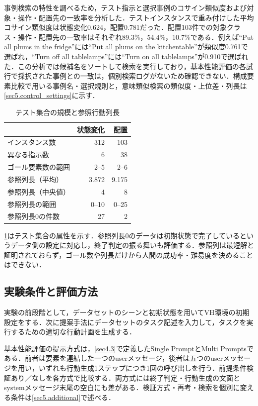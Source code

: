 事例検索の特性を調べるため，テスト指示と選択事例のコサイン類似度および対象・操作・配置先の一致率を分析した．テストインスタンスで重み付けした平均コサイン類似度は状態変化0.624，配置0.781だった．配置103件での対象クラス・操作・配置先の一致率はそれぞれ89.3\%，54.4\%，10.7\%である．例えば``Put all plums in the fridge''には``Put all plums on the kitchentable''が類似度0.761で選ばれ，``Turn off all tablelamps''には``Turn on all tablelamps''が0.910で選ばれた．この分析では候補名をソートして検索を実行しており，基本性能評価の各試行で採択された事例との一致は，個別検索ログがないため確認できない．構成要素比較で用いる事例名・選択規則と，意味類似検索の類似度・上位差・列長は\ref{sec5.control_settings}に示す．

\begin{table}[tb]
\caption{テスト集合の規模と参照行動列長}\label{tab:dataset_extent}
\centering\small
\begin{tabular}{lrr}
\hline
 & 状態変化 & 配置 \\
\hline
インスタンス数 & 312 & 103 \\
異なる指示数 & 6 & 38 \\
ゴール要素数の範囲 & 2--5 & 2--6 \\
参照列長（平均） & 3.872 & 9.175 \\
参照列長（中央値） & 4 & 8 \\
参照列長の範囲 & 0--10 & 0--25 \\
参照列長0の件数 & 27 & 2 \\
\hline
\end{tabular}
\end{table}

\ref{tab:dataset_extent}はテスト集合の属性を示す．参照列長0のデータは初期状態で完了しているというデータ側の設定に対応し，終了判定の振る舞いも評価する．参照列は最短解と証明されておらず，ゴール数や列長だけから人間の成功率・難易度を決めることはできない．

\subsection{実験条件と評価方法}\label{sec5.2}
実験の前段階として，データセットのシーンと初期状態を用いてVH環境の初期設定をする．次に提案手法にデータセットのタスク記述を入力して，タスクを実行するための適切な行動計画を生成する．

基本性能評価の提示方式は，\ref{sec4.3}で定義したSingle PromptとMulti Promptsである．前者は要素を連結した一つのuserメッセージ，後者は五つのuserメッセージを用い，いずれも行動生成1ステップにつき1回の呼び出しを行う．前提条件検証あり／なしを各方式で比較する．両方式には終了判定・行動生成の文面とsystemメッセージ末尾の空白にも差がある．検証方式・再考・検索を個別に変える条件は\ref{sec5.additional}で述べる．

